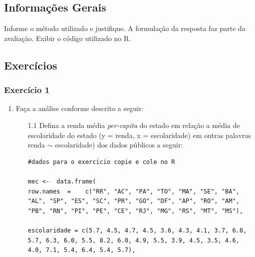 \documentclass[a4paper,12pt]{article}
\begin{document}
\subsection{Informações Gerais}

Informe o método utilizado e justifique. A formulação da resposta faz parte da avaliação. Exibir o código utilizado no R.

\subsection{Exercícios}

\subsubsection{Exercício 1}

\begin{enumerate}
    \item Faça a análise conforme descrito a seguir:
    \begin{enumerate}
        \item[1.1] Defina a renda média \textit{per-capita} do estado em relação a média de escolaridade do estado (y = renda, x = escolaridade) em outras palavras renda $\sim$ escolaridade) dos dados públicos a seguir:
            \begin{lstlisting}
#dados para o exercicio copie e cole no R

mec <-  data.frame(  
row.names  =    c("RR", "AC", "PA", "TO", "MA", "SE", "BA", 
"AL", "SP", "ES", "SC", "PR", "GO", "DF", "AP", "RO", "AM", 
"PB", "RN", "PI", "PE", "CE", "RJ", "MG", "RS", "MT", "MS"),
  
escolaridade = c(5.7, 4.5, 4.7, 4.5, 3.6, 4.3, 4.1, 3.7, 6.8,
5.7, 6.3, 6.0, 5.5, 8.2, 6.0, 4.9, 5.5, 3.9, 4.5, 3.5, 4.6, 
4.0, 7.1, 5.4, 6.4, 5.4, 5.7),
  

\end{lstlisting}
\end{enumerate}
\end{enumerate}
\end{document}
